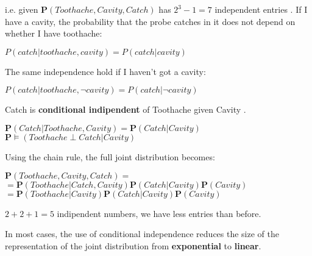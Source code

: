 \begin{example}
    i.e. given $\mathbf{P}(Toothache, Cavity, Catch)$ has $2^3 - 1 = 7$ independent entries . If I have a cavity, the probability that the probe catches in it does not depend on whether I have toothache: \vspace{3.5pt}
    \begin{center}
        $P(catch|toothache, cavity) = P(catch|cavity)$
    \end{center} \vspace{3.5pt}
    The same independence hold if I haven't got a cavity: \vspace{3.5pt}
    \begin{center}
        $P(catch|toothache, \neg cavity) = P(catch|\neg cavity)$
    \end{center} \vspace{3.5pt}
    Catch is \textbf{conditional indipendent} of Toothache given Cavity . \vspace{3.5pt}
    \begin{center}
        $\mathbf{P}(Catch|Toothache, Cavity) = \mathbf{P}(Catch|Cavity)$ \vspace{3.5pt} \\
        $\mathbf{P} \models (Toothache \perp Catch|Cavity)$
    \end{center} \vspace{3.5pt}
    Using the chain rule, the full joint distribution becomes: \vspace{3.5pt}
    \begin{center}
        $\mathbf{P}(Toothache,Cavity,Catch) =$ \\
        $= \mathbf{P}(Toothache|Catch,Cavity)\mathbf{P}(Catch|Cavity)\mathbf{P}(Cavity)$ \\
        $= \mathbf{P}(Toothache|Cavity)\mathbf{P}(Catch|Cavity)\mathbf{P}(Cavity)$ \\
    \end{center} \vspace{3.5pt}
    $2 + 2 + 1 = 5$ indipendent numbers, we have less entries than before. \vspace{3.5pt}

    In most cases, the use of conditional independence reduces the size of the representation of the joint distribution from \textbf{exponential} to \textbf{linear}.
\end{example}
